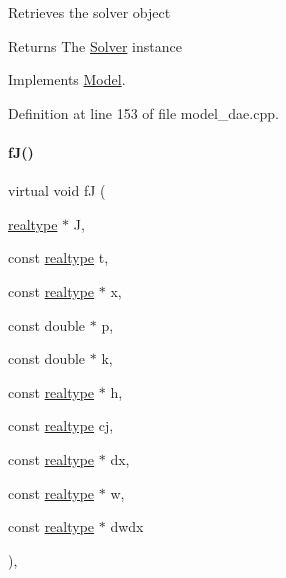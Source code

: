 Retrieves the solver object \begin{DoxyReturn}{Returns}
The \mbox{\hyperlink{classamici_1_1_solver}{Solver}} instance 
\end{DoxyReturn}


Implements \mbox{\hyperlink{classamici_1_1_model_a61d5b19b2e4d5ffcc73a014d59494344}{Model}}.



Definition at line 153 of file model\+\_\+dae.\+cpp.

\mbox{\label{classamici_1_1_model___d_a_e_a81b48d60fb3d3d5cc8d27bf95311ac7d}} 
\paragraph{\texorpdfstring{f\+J()}{fJ()}\hspace{0.1cm}{\footnotesize\ttfamily [3/3]}}
{\footnotesize\ttfamily virtual void fJ (\begin{DoxyParamCaption}\item[{\mbox{\hyperlink{namespaceamici_a1bdce28051d6a53868f7ccbf5f2c14a3}{realtype}} $\ast$}]{J,  }\item[{const \mbox{\hyperlink{namespaceamici_a1bdce28051d6a53868f7ccbf5f2c14a3}{realtype}}}]{t,  }\item[{const \mbox{\hyperlink{namespaceamici_a1bdce28051d6a53868f7ccbf5f2c14a3}{realtype}} $\ast$}]{x,  }\item[{const double $\ast$}]{p,  }\item[{const double $\ast$}]{k,  }\item[{const \mbox{\hyperlink{namespaceamici_a1bdce28051d6a53868f7ccbf5f2c14a3}{realtype}} $\ast$}]{h,  }\item[{const \mbox{\hyperlink{namespaceamici_a1bdce28051d6a53868f7ccbf5f2c14a3}{realtype}}}]{cj,  }\item[{const \mbox{\hyperlink{namespaceamici_a1bdce28051d6a53868f7ccbf5f2c14a3}{realtype}} $\ast$}]{dx,  }\item[{const \mbox{\hyperlink{namespaceamici_a1bdce28051d6a53868f7ccbf5f2c14a3}{realtype}} $\ast$}]{w,  }\item[{const \mbox{\hyperlink{namespaceamici_a1bdce28051d6a53868f7ccbf5f2c14a3}{realtype}} $\ast$}]{dwdx }\end{DoxyParamCaption})\hspace{0.3cm}{\ttfamily [protected]}, {}}

